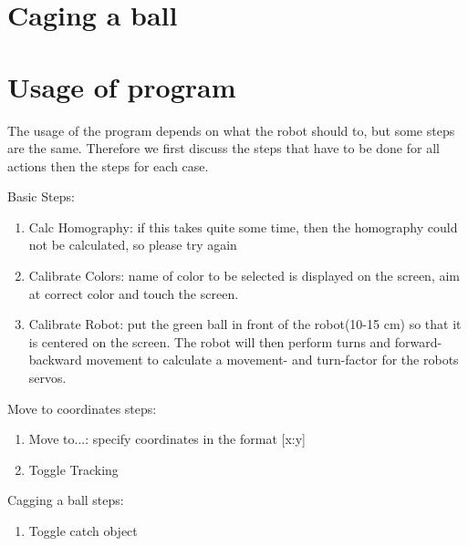 \documentclass[703031]{iisreport}
\begin{document}
\section{Caging a ball}

\section{Usage of program}
The usage of the program depends on what the robot should to, but some steps are the same. Therefore we first discuss the steps that have to be done for all actions then the steps for each case.

Basic Steps:
	\begin{enumerate}
		\item Calc Homography: if this takes quite some time, then the homography could not be calculated, so please try again
		\item Calibrate Colors: name of color to be selected is displayed on the screen, aim at correct color and touch the screen.
		\item Calibrate Robot: put the green ball in front of the robot(10-15 cm) so that it is centered on the screen. The robot will then perform turns and forward-backward movement to calculate a movement- and turn-factor for the robots servos.
	\end{enumerate}
	
Move to coordinates steps:
	\begin{enumerate}
		\item Move to...: specify coordinates in the format [x:y]
		\item Toggle Tracking
	\end{enumerate}

Cagging a ball steps:
	\begin{enumerate}
		\item Toggle catch object
	\end{enumerate}
\end{document}
